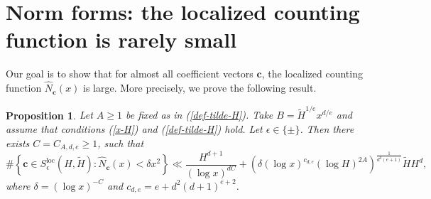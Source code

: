 \documentclass[reqno, 11pt]{amsart}
\renewcommand{\geq}{\geqslant}
\newtheorem{prop}[theorem]{Proposition}
\theoremstyle{definition}
\theoremstyle{definition}
\renewcommand{\geq}{\geqslant}
\newcommand{\cc}{\mathbf{c}}
\numberwithin{equation}{section}
\begin{document}
\section{Norm forms: the localized counting function is rarely small}


Our goal is to show that for almost all coefficient vectors $\cc$, the localized counting function $\hat{N}_\cc(x)$ is large. More precisely, we prove the following result.

\begin{prop}\label{lcf-rs}
	Let $A \geq 1$ be fixed as in (\ref{def-tilde-H}). Take $B = \tilde{H}^{1/e}x^{d/e}$ and assume that conditions (\ref{x-H}) and (\ref{def-tilde-H}) hold. Let $\epsilon \in \{\pm\}$. Then there exists $C = C_{A, d ,e} \geq 1$, such that
	\[
\# \left\{ \mathbf{c} \in S_\epsilon^{\text{loc}}(H, \tilde{H}) : \hat{N}_\mathbf{c}(x) < \delta x^2 \right\} 
\ll \frac{H^{d+1}}{(\log x)^{dC}} 
+ \left(\delta (\log x)^{c_{d,e}} (\log H)^{2A} \right)^{\frac{1}{d^2 (e+1)}} \tilde{H} H^d,
\]
where $\delta = (\log x)^{-C}$ and $c_{d,e} = e + d^2(d+1)^{e+2}$.
\end{prop}
\end{document}
